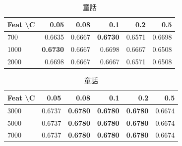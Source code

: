 \documentclass[uplatex, dvipdfmx, 11pt, a4paper, report]{jsbook}
\begin{document}
\begin{table}[H]
    \centering
    \small
    \begin{minipage}[t]{0.48\textwidth}
        \centering
        \caption{パニック}
        \begin{tabular}{l|rrrrr}
            \hline
            Feat \textbackslash C & 0.05 & 0.08 & 0.1 & 0.2 & 0.5 \\ \hline
            700 & 0.6635 & 0.6667 & \textbf{0.6730} & 0.6571 & 0.6698 \\
            1000 & \textbf{0.6730} & 0.6667 & 0.6698 & 0.6667 & 0.6508 \\
            2000 & 0.6698 & 0.6667 & 0.6667 & 0.6571 & 0.6508 \\ \hline
        \end{tabular}
    \end{minipage}
    \hfill
    \begin{minipage}[t]{0.48\textwidth}
        \centering
        \caption{童話}
        \begin{tabular}{l|rrrrr}
            \hline
            Feat \textbackslash C & 0.05 & 0.08 & 0.1 & 0.2 & 0.5 \\ \hline
            3000 & 0.6737 & \textbf{0.6780} & \textbf{0.6780} & \textbf{0.6780} & 0.6674 \\
            5000 & 0.6737 & \textbf{0.6780} & \textbf{0.6780} & \textbf{0.6780} & 0.6674 \\
            7000 & 0.6737 & \textbf{0.6780} & \textbf{0.6780} & \textbf{0.6780} & 0.6674 \\ \hline
        \end{tabular}
    \end{minipage}
\end{table}
\end{document}
